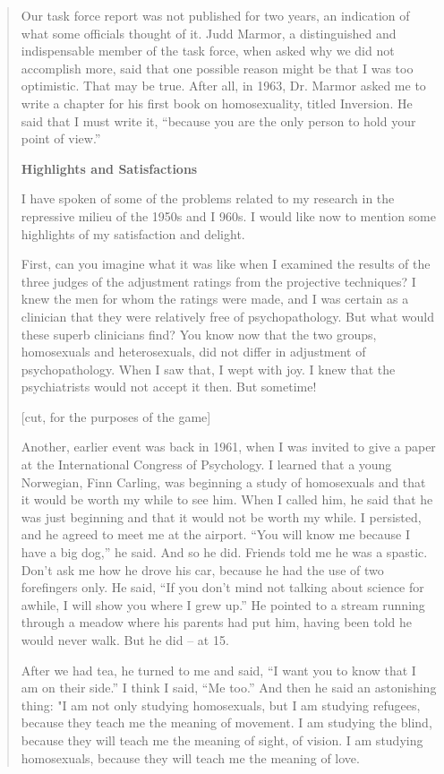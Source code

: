 \begin{quote}
Our task force report was not published for two years, an indication of what some officials thought of it. Judd Marmor, a distinguished and indispensable member of the task force, when asked why we did not accomplish more, said that one possible reason might be that I was too optimistic. That may be true. After all, in 1963, Dr. Marmor asked me to write a chapter for his first book on homosexuality, titled Inversion. He said that I must write it, ``because you are the only person to hold your point of view.''

\textbf{Highlights and Satisfactions} 

I have spoken of some of the problems related to my research in the repressive milieu of the 1950s and I 960s. I would like now to mention some highlights of my satisfaction and delight.

First, can you imagine what it was like when I examined the results of the three judges of the adjustment ratings from the projective techniques? I knew the men for whom the ratings were made, and I was certain as a clinician that they were relatively free of psychopathology. But what would these superb clinicians find? You know now that the two groups, homosexuals and heterosexuals, did not differ in adjustment of psychopathology. When I saw that, I wept with joy. I knew that the psychiatrists would not accept it then. But sometime!

[cut, for the purposes of the game]

Another, earlier event was back in 1961, when I was invited to give a paper at the International Congress of Psychology. I learned that a young Norwegian, Finn Carling, was beginning a study of homosexuals and that it would be worth my while to see him. When I called him, he said that he was just beginning and that it would not be worth my while. I persisted, and he agreed to meet me at the airport. ``You will know me because I have a big dog,'' he said. And so he did. Friends told me he was a spastic. Don't ask me how he drove his car, because he had the use of two forefingers only. He said, ``If you don't mind not talking about science for awhile, I will show you where I grew up.'' He pointed to a stream running through a meadow where his parents had put him, having been told he would never walk. But he did – at 15.

After we had tea, he turned to me and said, ``I want you to know that I am on their side.'' I think I said, ``Me too.'' And then he said an astonishing thing: "I am not only studying homosexuals, but I am studying refugees, because they teach me the meaning of movement. I am studying the blind, because they will teach me the meaning of sight, of vision. I am studying homosexuals, because they will teach me the meaning of love.


\end{quote}

